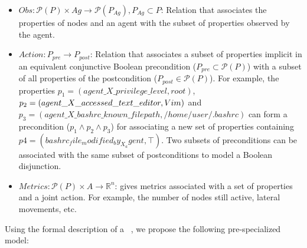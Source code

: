 \begin{itemize}
\item $Obs: \mathcal{P}(P) \times Ag \rightarrow \mathcal{P}(P_{Ag}), P_{Ag} \subset P$: Relation that associates the properties of nodes and an agent with the subset of properties observed by the agent.



\item $Action: P_{pre} \rightarrow P_{post}$: Relation that associates a subset of properties implicit in an equivalent conjunctive Boolean precondition ($P_{pre} \subset \mathcal{P}(P)$) with a subset of all properties of the postcondition ($P_{post} \in \mathcal{P} (P)$). For example, the properties $p_1 = (agent\_X\_privilege\_level, \allowbreak root)$, $p_2 = (agent\_X\_acce\-\allowbreak ssed\_text\_editor, \allowbreak Vim)$ and $p_3 = (agent\_X\_bashrc\_known\_filepath, /home/user/ .bashrc)$ can form a precondition ($p_1 \land p_2 \land p_3$) for associating a new set of properties containing $p4 = (bashrc_file_modified_by_X_agent, \top)$. Two subsets of preconditions can be associated with the same subset of postconditions to model a Boolean disjunction.

\item $Metrics: \mathcal{P}(P) \times A \rightarrow \mathbb{R}^{n}$: gives metrics associated with a set of properties and a joint action. For example, the number of nodes still active, lateral movements, etc.

\end {itemize}


Using the formal description of a ~\cite{Oliehoek2016}, we propose the following pre-specialized  model:

